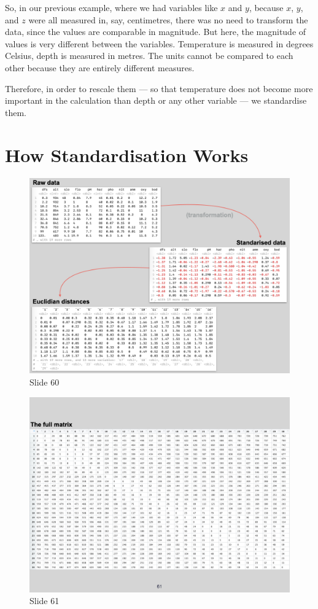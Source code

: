 \documentclass[
  12pt,
]{book}
\begin{document}
So, in our previous example, where we had variables like \(x\) and
\(y\), because \(x\), \(y\), and \(z\) were all measured in, say,
centimetres, there was no need to transform the data, since the values
are comparable in magnitude. But here, the magnitude of values is very
different between the variables. Temperature is measured in degrees
Celsius, depth is measured in metres. The units cannot be compared to
each other because they are entirely different measures.

Therefore, in order to rescale them --- so that temperature does not
become more important in the calculation than depth or any other
variable --- we standardise them.

\section{How Standardisation Works}\label{how-standardisation-works}

\begin{figure}[ht]
\centering
\includegraphics[width=0.8\linewidth]{../images/BDC334/BDC334-060.jpeg}
\caption*{Slide 60}
\end{figure}

\begin{figure}[ht]
\centering
\includegraphics[width=0.8\linewidth]{../images/BDC334/BDC334-061.jpeg}
\caption*{Slide 61}
\end{figure}
\end{document}
